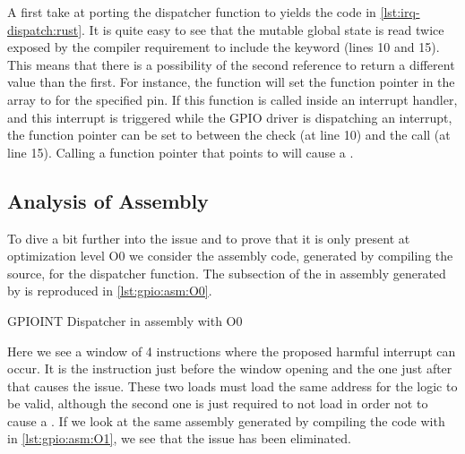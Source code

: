 A first take at porting the dispatcher function to {\rust} yields the code in \autoref{lst:irq-dispatch:rust}.
It is quite easy to see that the mutable global state is read twice exposed by the compiler requirement to include the {\unsafe} keyword (lines 10 and 15).
This means that there is a possibility of the second reference to return a different value than the first.
For instance, the function  will set the function pointer in the array to  for the specified pin.
If this function is called inside an interrupt handler, and this interrupt is triggered while the GPIO driver is dispatching an interrupt, the function pointer can be set to  between the check (at line 10) and the call (at line 15).
Calling a function pointer that points to  will cause a .

\subsection{Analysis of Assembly}
To dive a bit further into the issue and to prove that it is only present at optimization level O0 we consider the assembly code, generated by compiling the {\C} source, for the dispatcher function.
The subsection of the  in assembly generated by  is reproduced in \autoref{lst:gpio:asm:O0}.

\begin{listing}[H]
  \caption{GPIOINT Dispatcher in assembly with O0}
  \label{lst:gpio:asm:O0}
\end{listing}

Here we see a window of 4 instructions where the proposed harmful interrupt can occur.
It is the  instruction just before the window opening and the one just after that causes the issue.
These two loads must load the same address for the logic to be valid, although the second one is just required to not load  in order not to cause a .
If we look at the same assembly generated by compiling the code with  in \autoref{lst:gpio:asm:O1}, we see that the issue has been eliminated.

